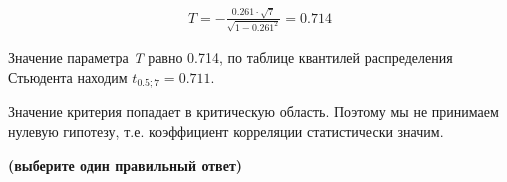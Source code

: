 \documentclass[12pt, table, twoside, a4paper]{exam}
\begin{document}
\begin{questions}
\begin{subparts}
\begin{solution}[6em]
			\begin{align*}
				T=-\frac{0.261 \cdot \sqrt{7}}{\sqrt{1-0.261^2}}=0.714
			\end{align*}

			Значение параметра \textit{T} равно 0.714, по таблице квантилей распределения Стьюдента находим $t_{0.5;7}=0.711$.
			
			Значение критерия попадает в критическую область. Поэтому мы не принимаем нулевую гипотезу, т.е. коэффициент корреляции статистически значим.
			
		\end{solution}
		
	\end{subparts}
	\addpoints
	
\end{questions}

\pagebreak
\noindent\textbf{(выберите один правильный ответ)}
\end{document}
